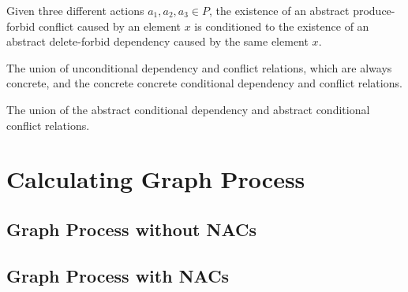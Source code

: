 \begin{remark} Given three different actions $a_1,a_2,a_3 \in P$, the existence of an abstract produce-forbid conflict caused by an element $x$ is conditioned to the existence of an abstract delete-forbid dependency caused by the same element $x$.
\end{remark}

\begin{definition} The union of unconditional dependency and conflict relations, which are always concrete, and the concrete concrete conditional dependency and conflict relations.
\end{definition}

\begin{definition} The union of the abstract conditional dependency and abstract conditional conflict relations.
\end{definition}

\begin{definition}
\end{definition}

\begin{definition}
\end{definition}

\begin{definition}
\end{definition}

\section{Calculating Graph Process}

\subsection{Graph Process without NACs}

\begin{definition}
\end{definition}

\subsection{Graph Process with NACs}

